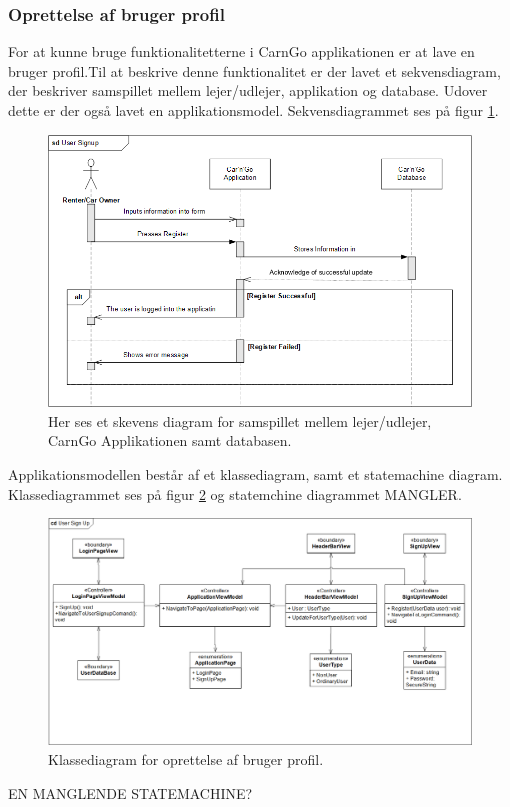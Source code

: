 \documentclass[Arkitektur/System_main.tex]{subfiles}
\begin{document}
\subsubsection{Oprettelse af bruger profil}
For at kunne bruge funktionalitetterne i CarnGo applikationen er at lave en bruger profil.Til at beskrive denne funktionalitet er der lavet et sekvensdiagram, der beskriver samspillet mellem lejer/udlejer, applikation og database. Udover dette er der også lavet en applikationsmodel. Sekvensdiagrammet ses på figur \ref{fig:UserSignUpSD}.
\begin{figure}[H]
    \centering
    \includegraphics[width=\textwidth]{Arkitektur/Softwarearkitektur/User_Signup/graphics/UserSignupSD.png}
    \caption{Her ses et skevens diagram for samspillet mellem lejer/udlejer, CarnGo Applikationen samt databasen.}
    \label{fig:UserSignUpSD}
\end{figure}

Applikationsmodellen består af et klassediagram, samt et statemachine diagram. Klassediagrammet ses på figur \ref{fig:UserSignUpCD} og statemchine diagrammet MANGLER.
\begin{figure}[H]
    \centering
    \includegraphics[width=\textwidth]{Arkitektur/Softwarearkitektur/User_Signup/graphics/UserSignUpCD.png}
    \caption{Klassediagram for oprettelse af bruger profil. }
    \label{fig:UserSignUpCD}
\end{figure}
EN MANGLENDE STATEMACHINE?
\end{document}
